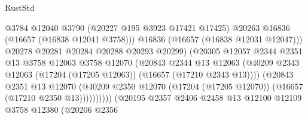 \begin{lexlean}{RustStd}
\begin{coremodule}
                                            @3784
                                            @12040
                                            @3790
                                            (@20227 @195 @3923 @17421 @17425)
                                            @20263
                                            @16836
                                            (@16657 (@16838 @12041 @3758)))
                                          @16836
                                          (@16657 (@16838 @12031 @12047)))
                                        @20278
                                        @20281
                                        @20284
                                        @20288
                                        @20293
                                        @20299)
                                      (@20305
                                        @12057
                                        @2344
                                        @2351
                                        @13
                                        @3758
                                        @12063
                                        @3758
                                        @12070
                                        (@20843
                                          @2344
                                          @13
                                          @12063
                                          (@40209
                                            @2343
                                            @12063
                                            (@17204 (@17205 @12063))
                                            (@16657 (@17210 @2343 @13))))
                                        (@20843
                                          @2351
                                          @13
                                          @12070
                                          (@40209
                                            @2350
                                            @12070
                                            (@17204 (@17205 @12070))
                                            (@16657 (@17210 @2350 @13))))))))))
                            (@20195
                              @2357
                              @2406
                              @2458
                              @13
                              @12100
                              @12109
                              @3758
                              @12380
                              (@20206
                                @2356

\end{coremodule}
\end{lexlean}
